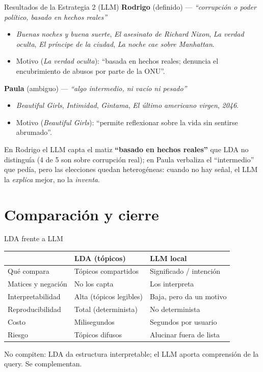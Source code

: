 \documentclass[10pt,aspectratio=169]{beamer}
\begin{document}
\begin{frame}{Resultados de la Estrategia 2 (LLM)}
  \textbf{Rodrigo} (definido) --- \textit{``corrupción o poder político, basado en hechos reales''}
  \begin{itemize}\footnotesize
    \item \textit{Buenas noches y buena suerte}, \textit{El asesinato de Richard Nixon}, \textit{La verdad oculta}, \textit{El príncipe de la ciudad}, \textit{La noche cae sobre Manhattan}.
    \item Motivo (\textit{La verdad oculta}): ``basada en hechos reales; denuncia el encubrimiento de abusos por parte de la ONU''.
  \end{itemize}
  \textbf{Paula} (ambiguo) --- \textit{``algo intermedio, ni vacío ni pesado''}
  \begin{itemize}\footnotesize
    \item \textit{Beautiful Girls}, \textit{Intimidad}, \textit{Gintama}, \textit{El último americano virgen}, \textit{2046}.
    \item Motivo (\textit{Beautiful Girls}): ``permite reflexionar sobre la vida sin sentirse abrumado''.
  \end{itemize}
  \vspace{0.3em}
  \footnotesize En Rodrigo el LLM capta el matiz \textbf{``basado en hechos reales''} que LDA no distinguía (4 de 5 son sobre corrupción real); en Paula verbaliza el ``intermedio'' que pedía, pero las elecciones quedan heterogéneas: cuando no hay señal, el LLM la \emph{explica} mejor, no la \emph{inventa}.
\end{frame}

\section{Comparación y cierre}

\begin{frame}{LDA frente a LLM}
  \centering
  \begin{tabular}{p{} p{} p{}}
    \toprule
    & \textbf{LDA (tópicos)} & \textbf{LLM local} \\
    \midrule
    Qué compara & Tópicos compartidos & Significado / intención \\
    Matices y negación & No los capta & Los interpreta \\
    Interpretabilidad & Alta (tópicos legibles) & Baja, pero da un motivo \\
    Reproducibilidad & Total (determinista) & No determinista \\
    Costo & Milisegundos & Segundos por usuario \\
    Riesgo & Tópicos difusos & Alucinar fuera de lista \\
    \bottomrule
  \end{tabular}
  \vspace{0.5em}
  \par\footnotesize No compiten: LDA da estructura interpretable; el LLM aporta comprensión de la query. Se complementan.
\end{frame}
\end{document}
